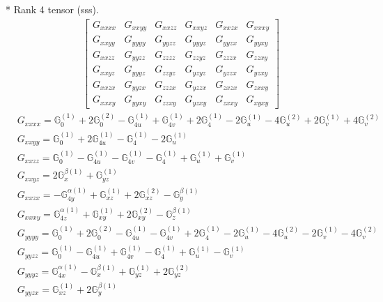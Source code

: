 \documentclass[fleqn,8pt,landscape]{jsarticle}
\begin{document}
* Rank 4 tensor (sss).
\begin{align*}
\begin{bmatrix} G_{xxxx} & G_{xxyy} & G_{xxzz} & G_{xxyz} & G_{xxzx} & G_{xxxy} \\ G_{xxyy} & G_{yyyy} & G_{yyzz} & G_{yyyz} & G_{yyzx} & G_{yyxy} \\ G_{xxzz} & G_{yyzz} & G_{zzzz} & G_{zzyz} & G_{zzzx} & G_{zzxy} \\ G_{xxyz} & G_{yyyz} & G_{zzyz} & G_{yzyz} & G_{yzzx} & G_{yzxy} \\ G_{xxzx} & G_{yyzx} & G_{zzzx} & G_{yzzx} & G_{zxzx} & G_{zxxy} \\ G_{xxxy} & G_{yyxy} & G_{zzxy} & G_{yzxy} & G_{zxxy} & G_{xyxy} \end{bmatrix}
\end{align*}
\begin{align*}
& G_{xxxx} = \mathbb{G}_{0}^{(1)} + 2 \mathbb{G}_{0}^{(2)} - \mathbb{G}_{4u}^{(1)} + \mathbb{G}_{4v}^{(1)} + 2 \mathbb{G}_{4}^{(1)} - 2 \mathbb{G}_{u}^{(1)} - 4 \mathbb{G}_{u}^{(2)} + 2 \mathbb{G}_{v}^{(1)} + 4 \mathbb{G}_{v}^{(2)} \\
& G_{xxyy} = \mathbb{G}_{0}^{(1)} + 2 \mathbb{G}_{4u}^{(1)} - \mathbb{G}_{4}^{(1)} - 2 \mathbb{G}_{u}^{(1)} \\
& G_{xxzz} = \mathbb{G}_{0}^{(1)} - \mathbb{G}_{4u}^{(1)} - \mathbb{G}_{4v}^{(1)} - \mathbb{G}_{4}^{(1)} + \mathbb{G}_{u}^{(1)} + \mathbb{G}_{v}^{(1)} \\
& G_{xxyz} = 2 \mathbb{G}_{x}^{\beta(1)} + \mathbb{G}_{yz}^{(1)} \\
& G_{xxzx} = - \mathbb{G}_{4y}^{\alpha(1)} + \mathbb{G}_{xz}^{(1)} + 2 \mathbb{G}_{xz}^{(2)} - \mathbb{G}_{y}^{\beta(1)} \\
& G_{xxxy} = \mathbb{G}_{4z}^{\alpha(1)} + \mathbb{G}_{xy}^{(1)} + 2 \mathbb{G}_{xy}^{(2)} - \mathbb{G}_{z}^{\beta(1)} \\
& G_{yyyy} = \mathbb{G}_{0}^{(1)} + 2 \mathbb{G}_{0}^{(2)} - \mathbb{G}_{4u}^{(1)} - \mathbb{G}_{4v}^{(1)} + 2 \mathbb{G}_{4}^{(1)} - 2 \mathbb{G}_{u}^{(1)} - 4 \mathbb{G}_{u}^{(2)} - 2 \mathbb{G}_{v}^{(1)} - 4 \mathbb{G}_{v}^{(2)} \\
& G_{yyzz} = \mathbb{G}_{0}^{(1)} - \mathbb{G}_{4u}^{(1)} + \mathbb{G}_{4v}^{(1)} - \mathbb{G}_{4}^{(1)} + \mathbb{G}_{u}^{(1)} - \mathbb{G}_{v}^{(1)} \\
& G_{yyyz} = \mathbb{G}_{4x}^{\alpha(1)} - \mathbb{G}_{x}^{\beta(1)} + \mathbb{G}_{yz}^{(1)} + 2 \mathbb{G}_{yz}^{(2)} \\
& G_{yyzx} = \mathbb{G}_{xz}^{(1)} + 2 \mathbb{G}_{y}^{\beta(1)} \\

\end{align*}
\end{document}

